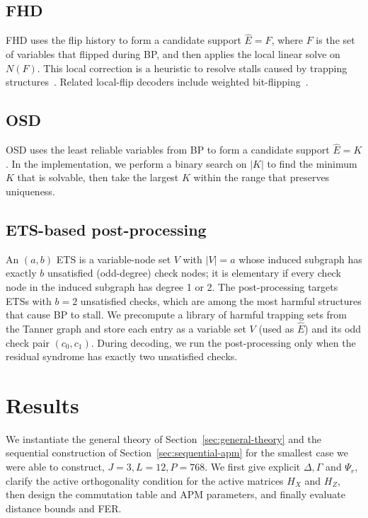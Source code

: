 \documentclass[a4paper,onecolumn,11pt,accepted=2026-08-03]{quantumarticle}
\renewcommand\[{\begin{equation}}
\renewcommand\]{\end{equation}}
\theoremstyle{definition}
\begin{document}
\subsection{FHD}
FHD  uses the flip history to form a candidate support $\hat{E}=F$, where $F$ is the set of variables that flipped during BP, and then applies the local linear solve on $N(F)$. 
This local correction is a heuristic to resolve stalls caused by trapping structures~\cite{Richardson2003ErrorFloors}. Related local-flip decoders include weighted bit-flipping~\cite{ZhangFossorier2004}. 

\subsection{OSD}
OSD  uses the least reliable variables from BP to form a candidate support $\hat{E}=K$. 
In the implementation, we perform a binary search on $|K|$ to find the minimum $K$ that is solvable, then take the largest $K$ within the range that preserves uniqueness. 


\subsection{ETS-based post-processing}
An $(a,b)$   ETS  is a variable-node set $V$ with $|V|=a$ whose induced subgraph has exactly $b$ unsatisfied (odd-degree) check nodes; it is elementary if every check node in the induced subgraph has degree 1 or 2.
The post-processing targets   ETSs  with $b=2$ unsatisfied checks, which are among the most harmful structures that cause BP to stall. 
We precompute a library of harmful trapping sets from the Tanner graph and store each entry as a variable set $V$ (used as $\hat{E}$) and its odd check pair $(c_0,c_1)$. 
During decoding, we run the post-processing only when the residual syndrome has exactly two unsatisfied checks.

\section{Results}
\label{sec:example}

We instantiate the general theory of Section~\ref{sec:general-theory} and the sequential construction of Section~\ref{sec:sequential-apm} for the smallest case we were able to construct, $J=3,L=12,P=768$. We first give explicit $\Delta,\Gamma$ and $\Psi_r$, clarify the active orthogonality condition for the active matrices $H_X$ and $H_Z$, then design the commutation table and APM parameters, and finally evaluate distance bounds and FER.
\end{document}
